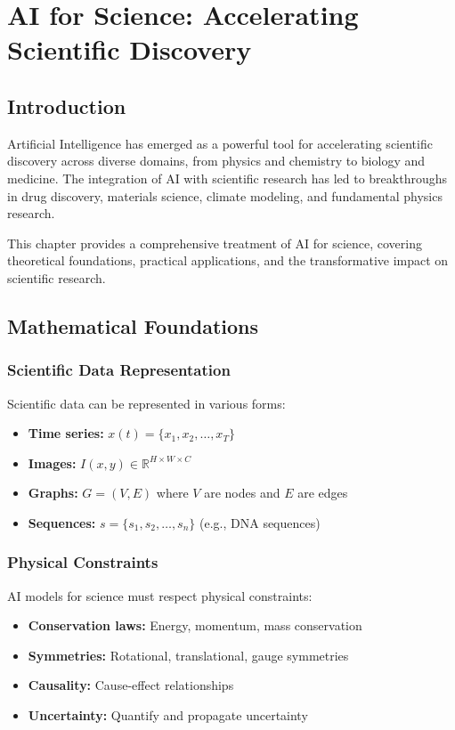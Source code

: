 \chapter{AI for Science: Accelerating Scientific Discovery}

\section{Introduction}

Artificial Intelligence has emerged as a powerful tool for accelerating scientific discovery across diverse domains, from physics and chemistry to biology and medicine. The integration of AI with scientific research has led to breakthroughs in drug discovery, materials science, climate modeling, and fundamental physics research.

This chapter provides a comprehensive treatment of AI for science, covering theoretical foundations, practical applications, and the transformative impact on scientific research.

\section{Mathematical Foundations}

\subsection{Scientific Data Representation}

Scientific data can be represented in various forms:
\begin{itemize}
    \item \textbf{Time series:} $x(t) = \{x_1, x_2, \ldots, x_T\}$
    \item \textbf{Images:} $I(x,y) \in \mathbb{R}^{H \times W \times C}$
    \item \textbf{Graphs:} $G = (V, E)$ where $V$ are nodes and $E$ are edges
    \item \textbf{Sequences:} $s = \{s_1, s_2, \ldots, s_n\}$ (e.g., DNA sequences)
\end{itemize}

\subsection{Physical Constraints}

AI models for science must respect physical constraints:
\begin{itemize}
    \item \textbf{Conservation laws:} Energy, momentum, mass conservation
    \item \textbf{Symmetries:} Rotational, translational, gauge symmetries
    \item \textbf{Causality:} Cause-effect relationships
    \item \textbf{Uncertainty:} Quantify and propagate uncertainty
\end{itemize}

